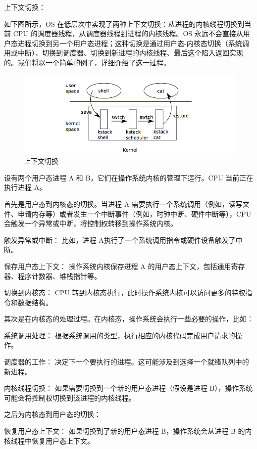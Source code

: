 上下文切换：

如下图所示，OS 在低层次中实现了两种上下文切换：从进程的内核线程切换到当前 CPU 的调度器线程，从调度器线程到进程的内核线程。OS 永远不会直接从用户态进程切换到另一个用户态进程；这种切换是通过用户态-内核态切换（系统调用或中断）、切换到调度器、切换到新进程的内核线程、最后这个陷入返回实现的。我们将以一个简单的例子，详细介绍了这一过程。

\begin{figure}[H]
    \centering
    \caption[short]{上下文切换}
    \includegraphics{figures/05-02-04上下文切换.png}
\end{figure}

设有两个用户态进程 A 和 B，它们在操作系统内核的管理下运行。CPU 当前正在执行进程 A。

首先是用户态到内核态的切换。当进程 A 需要执行一个系统调用（例如，读写文件、申请内存等）或者发生一个中断事件（例如，时钟中断、硬件中断等），CPU 会触发一个异常或中断，将控制权转移到操作系统内核。

触发异常或中断： 比如，进程 A执行了一个系统调用指令或硬件设备触发了中断。

保存用户态上下文： 操作系统内核保存进程 A 的用户态上下文，包括通用寄存器、程序计数器、堆栈指针等。

切换到内核态： CPU 转到内核态执行，此时操作系统内核可以访问更多的特权指令和数据结构。

其次是在内核态的处理过程。在内核态，操作系统会执行一些必要的操作，比如：

\quad  \textbullet 系统调用处理： 根据系统调用的类型，执行相应的内核代码完成用户请求的操作。

\quad  \textbullet 调度器的工作： 决定下一个要执行的进程。这可能涉及到选择一个就绪队列中的新进程。

内核线程切换： 如果需要切换到一个新的用户态进程（假设是进程 B），操作系统可能会将控制权切换到该进程的内核线程。

之后为内核态到用户态的切换：

\quad \textbullet 恢复用户态上下文： 如果切换到了新的用户态进程 B，操作系统会从进程 B 的内核线程中恢复用户态上下文。

